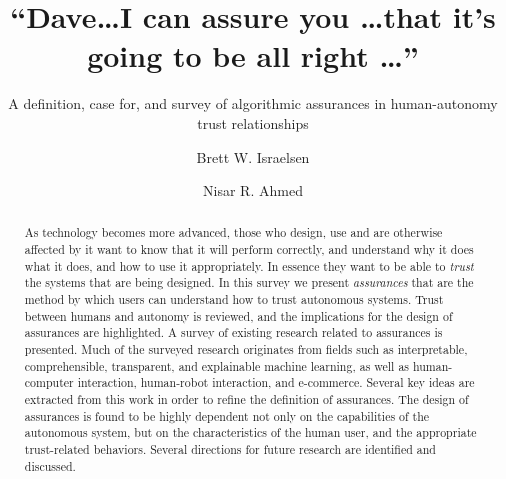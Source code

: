\documentclass[format=manuscript, screen,review=true]{acmart}
\begin{document}
\title{``Dave\ldots I can assure you \ldots that it's going to be all right \ldots''} 
 \subtitle{A definition, case for, and survey of algorithmic assurances in human-autonomy trust relationships}
\author{Brett W. Israelsen}
\author{Nisar R. Ahmed}

\begin{abstract}
    As technology becomes more advanced, those who design, use and are otherwise affected by it want to know that it will perform correctly, and understand why it does what it does, and how to use it appropriately. In essence they want to be able to \emph{trust} the systems that are being designed. In this survey we present \emph{assurances} that are the method by which users can understand how to trust autonomous systems. Trust between humans and autonomy is reviewed, and the implications for the design of assurances are highlighted. A survey of existing research related to assurances is presented. Much of the surveyed research originates from fields such as interpretable, comprehensible, transparent, and explainable machine learning, as well as human-computer interaction, human-robot interaction, and e-commerce. Several key ideas are extracted from this work in order to refine the definition of assurances. The design of assurances is found to be highly dependent not only on the capabilities of the autonomous system, but on the characteristics of the human user, and the appropriate trust-related behaviors. Several directions for future research are identified and discussed.
\end{abstract}
\end{document}
